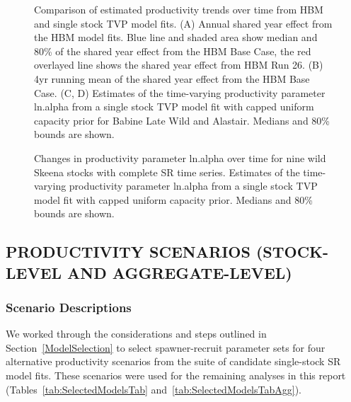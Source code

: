 \documentclass[french,11pt]{book}
\begin{document}
\begin{figure}[htb]

{\centering {} 

}

\caption{Comparison of estimated productivity trends over time from HBM and single stock TVP model fits. (A) Annual shared year effect from the HBM model fits. Blue line and shaded area show median and 80\% of the shared year effect from the HBM Base Case, the red overlayed line shows the shared year effect from HBM Run 26. (B) 4yr running mean of the shared year effect from the HBM Base Case. (C, D) Estimates of the time-varying productivity parameter ln.alpha from a single stock TVP model fit with capped uniform capacity prior for Babine Late Wild and Alastair. Medians and 80\% bounds are shown.}\label{fig:HBMComp5}
\end{figure}

\begin{figure}[htb]

{\centering {} 

}

\caption{Changes in productivity parameter ln.alpha over time for nine wild Skeena stocks with complete SR time series. Estimates of the time-varying productivity parameter ln.alpha from a single stock TVP model fit with capped uniform capacity prior. Medians and 80\% bounds are shown.}\label{fig:HBMComp6}
\end{figure}
\clearpage

\subsection{PRODUCTIVITY SCENARIOS (STOCK-LEVEL AND AGGREGATE-LEVEL)}\label{productivity-scenarios-stock-level-and-aggregate-level}

\subsubsection{Scenario Descriptions}\label{scenario-descriptions}

We worked through the considerations and steps outlined in Section~\ref{ModelSelection} to select spawner-recruit parameter sets for four alternative productivity scenarios from the suite of candidate single-stock SR model fits. These scenarios were used for the remaining analyses in this report (Tables~\ref{tab:SelectedModelsTab} and~\ref{tab:SelectedModelsTabAgg}).
\end{document}
